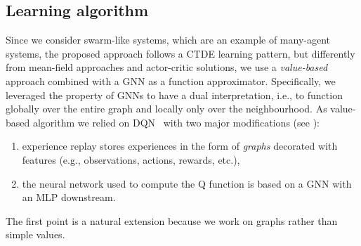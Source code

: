 \documentclass[conference]{IEEEtran}
\begin{document}
\subsection{Learning algorithm}
Since we consider swarm-like systems, which are an example of many-agent systems, 
 the proposed approach follows a \ac{CTDE} learning pattern,
 but differently from mean-field approaches and actor-critic solutions,
 we use a \emph{value-based} approach combined with a \ac{GNN} as a function approximator.
%
%
Specifically, we leveraged the property of \ac{GNN}s to have a dual interpretation, 
i.e., to function globally over the entire graph and locally only over the neighbourhood. 
%
As value-based algorithm we relied on \ac{DQN}~\cite{mnih2015playing}  with two major modifications (see ): 
\begin{enumerate}
  \item experience replay stores experiences in the form of \emph{graphs} decorated with features (e.g., observations, actions, rewards, etc.),
  \item the neural network used to compute the Q function is based on a \ac{GNN} with an \ac{MLP} downstream.
\end{enumerate}
The first point is a natural extension because we work on graphs rather than simple values. 
\end{document}
